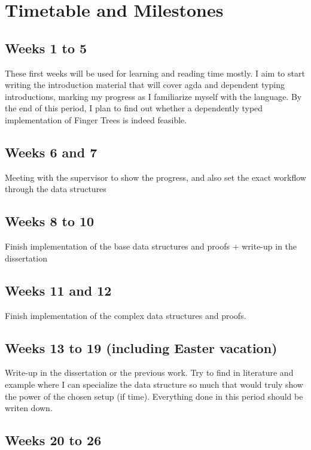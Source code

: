 \documentclass[12pt]{article}
\begin{document}
\section*{Timetable and Milestones}

\subsection*{Weeks 1 to 5}

These first weeks will be used for learning and reading time mostly. I aim to
start writing the introduction material that will cover agda and dependent typing
introductions, marking my progress as I familiarize myself with the language.
By the end of this period, I plan to find out whether a dependently typed implementation
of Finger Trees is indeed feasible.

\subsection*{Weeks 6 and 7}

Meeting with the supervisor to show the progress, and also set the exact workflow
through the data structures

\subsection*{Weeks 8 to 10}

Finish implementation of the base data structures and proofs + write-up in the
dissertation

\subsection*{Weeks 11 and 12}

Finish implementation of the complex data structures and proofs.
\subsection*{Weeks 13 to 19 (including Easter vacation)}

Write-up in the dissertation or the previous work. Try to find in literature and
example where I can specialize the data structure so much that would truly show
the power of the chosen setup (if time). Everything done in this period should
be writen down.

\subsection*{Weeks 20 to 26}
\end{document}
